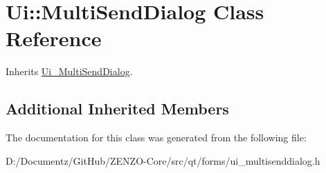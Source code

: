 \hypertarget{class_ui_1_1_multi_send_dialog}{}\section{Ui\+::Multi\+Send\+Dialog Class Reference}
\label{class_ui_1_1_multi_send_dialog}


Inherits \mbox{\hyperlink{class_ui___multi_send_dialog}{Ui\+\_\+\+Multi\+Send\+Dialog}}.

\subsection*{Additional Inherited Members}


The documentation for this class was generated from the following file\+:\begin{DoxyCompactItemize}
\item 
D\+:/\+Documentz/\+Git\+Hub/\+Z\+E\+N\+Z\+O-\/\+Core/src/qt/forms/ui\+\_\+multisenddialog.\+h\end{DoxyCompactItemize}
